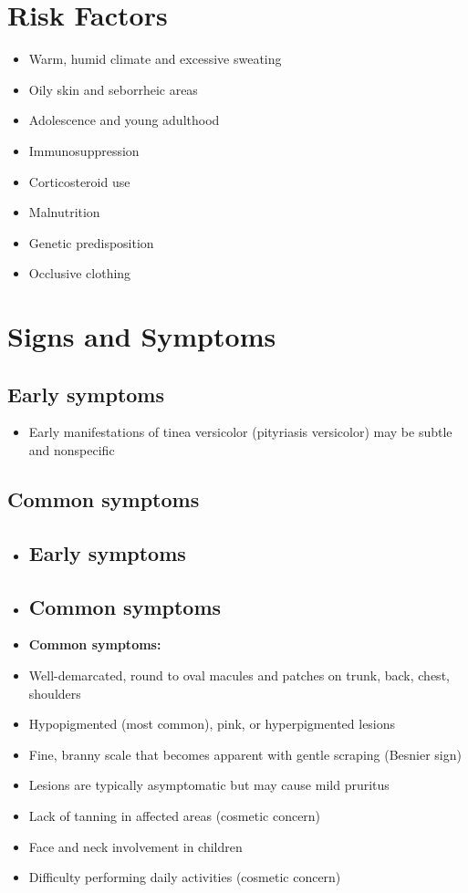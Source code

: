 \section{Risk Factors}

\begin{itemize}[noitemsep]
  \item Warm, humid climate and excessive sweating
  \item Oily skin and seborrheic areas
  \item Adolescence and young adulthood
  \item Immunosuppression
  \item Corticosteroid use
  \item Malnutrition
  \item Genetic predisposition
  \item Occlusive clothing
\end{itemize}

\section{Signs and Symptoms}

\subsection{Early symptoms}
\begin{itemize}[noitemsep]
  \item Early manifestations of tinea versicolor (pityriasis versicolor) may be subtle and nonspecific
\end{itemize}

\subsection{Common symptoms}
\begin{itemize}[noitemsep]
  \item \subsection{Early symptoms}
  \item \subsection{Common symptoms}
  \item \textbf{Common symptoms:}
  \item Well-demarcated, round to oval macules and patches on trunk, back, chest, shoulders
  \item Hypopigmented (most common), pink, or hyperpigmented lesions
  \item Fine, branny scale that becomes apparent with gentle scraping (Besnier sign)
  \item Lesions are typically asymptomatic but may cause mild pruritus
  \item Lack of tanning in affected areas (cosmetic concern)
  \item Face and neck involvement in children
  \item Difficulty performing daily activities (cosmetic concern)
\end{itemize}

